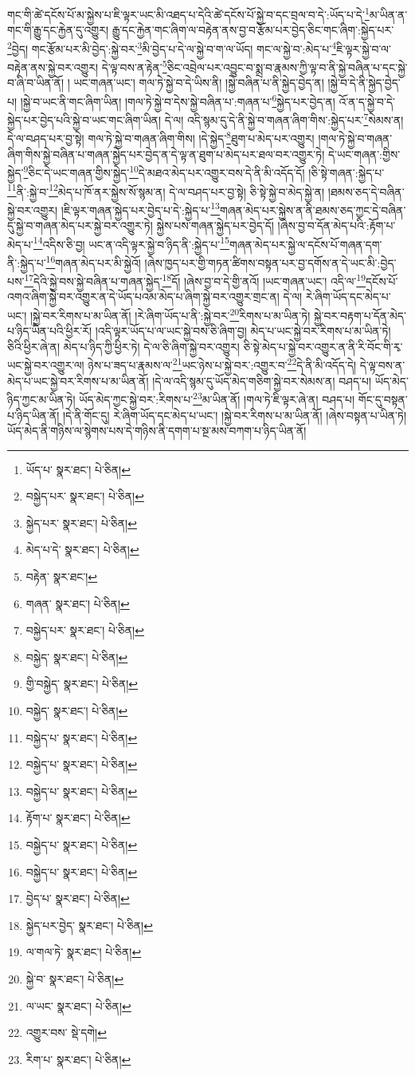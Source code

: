 གང་གི་ཚེ་དངོས་པོ་མ་སྐྱེས་པ་ཇི་ལྟར་ཡང་མི་འཐད་པ་དེའི་ཚེ་དངོས་པོ་སྐྱེ་བ་དང་བྲལ་བ་དེ་:ཡོད་པ་དེ་\footnote{ཡོད་པ་  སྣར་ཐང་།  པེ་ཅིན། }མ་ཡིན་ན་གང་གི་རྒྱུ་དང་རྐྱེན་དུ་འགྱུར། རྒྱུ་དང་རྐྱེན་གང་ཞིག་ལ་བརྟེན་ནས་བྱ་བ་རྩོམ་པར་བྱེད་ཅིང་གང་ཞིག་:སྐྱེད་པར་\footnote{བསྐྱེད་པར་  སྣར་ཐང་།  པེ་ཅིན། }བྱེད། གང་རྩོམ་པར་མི་བྱེད་:སྐྱེ་བར་\footnote{སྐྱེད་པར་  སྣར་ཐང་།  པེ་ཅིན། }མི་བྱེད་པ་དེ་ལ་སྐྱེ་བ་ག་ལ་ཡོད། གང་ལ་སྐྱེ་བ་:མེད་པ་\footnote{མེད་པ་དེ་  སྣར་ཐང་།  པེ་ཅིན། }ཇི་ལྟར་སྐྱེ་བ་ལ་བརྟེན་ནས་སྐྱེ་བར་འགྱུར། དེ་ལྟ་བས་ན་རྟེན་\footnote{བརྟེན་  སྣར་ཐང་། }ཅིང་འབྲེལ་པར་འབྱུང་བ་སྨྲ་བ་རྣམས་ཀྱི་ལྟ་བ་ནི་སྐྱེ་བཞིན་པ་དང་སྐྱེ་བ་ཞི་བ་ཡིན་ནོ། །
ཡང་གཞན་ཡང་། གལ་ཏེ་སྐྱེ་བ་དེ་ཡིས་ནི། །སྐྱེ་བཞིན་པ་ནི་སྐྱེད་བྱེད་ན། །སྐྱེ་བ་དེ་ནི་སྐྱེད་བྱེད་པ། །སྐྱེ་བ་ཡང་ནི་གང་ཞིག་ཡིན། །གལ་ཏེ་སྐྱེ་བ་དེས་སྐྱེ་བཞིན་པ་:གཞན་པ་\footnote{གཞན་  སྣར་ཐང་།  པེ་ཅིན། }སྐྱེད་པར་བྱེད་ན། འོ་ན་ད་སྐྱེ་བ་དེ་སྐྱེད་པར་བྱེད་པའི་སྐྱེ་བ་ཡང་གང་ཞིག་ཡིན། དེ་ལ། འདི་སྙམ་དུ་དེ་ནི་སྐྱེ་བ་གཞན་ཞིག་གིས་:སྐྱེད་པར་\footnote{བསྐྱེད་པར་  སྣར་ཐང་།  པེ་ཅིན། }སེམས་ན། དེ་ལ་བཤད་པར་བྱ་སྟེ། གལ་ཏེ་སྐྱེ་བ་གཞན་ཞིག་གིས། །དེ་སྐྱེད་\footnote{བསྐྱེད་  སྣར་ཐང་།  པེ་ཅིན། }ཐུག་པ་མེད་པར་འགྱུར། །གལ་ཏེ་སྐྱེ་བ་གཞན་ཞིག་གིས་སྐྱེ་བཞིན་པ་གཞན་སྐྱེད་པར་བྱེད་ན་དེ་ལྟ་ན་ཐུག་པ་མེད་པར་ཐལ་བར་འགྱུར་ཏེ། དེ་ཡང་གཞན་:གྱིས་སྐྱེད་\footnote{གྱི་བསྐྱེད་  སྣར་ཐང་།  པེ་ཅིན། }ཅིང་དེ་ཡང་གཞན་གྱིས་སྐྱེད་\footnote{བསྐྱེད་  སྣར་ཐང་།  པེ་ཅིན། }དེ་མཐའ་མེད་པར་འགྱུར་བས་དེ་ནི་མི་འདོད་དོ། །ཅི་སྟེ་གཞན་:སྐྱེད་པ་\footnote{བསྐྱེད་པ་  སྣར་ཐང་།  པེ་ཅིན། }ནི་:སྐྱེ་བ་\footnote{བསྐྱེད་པ་  སྣར་ཐང་།  པེ་ཅིན། }མེད་པ་ཁོ་ནར་སྐྱེས་སོ་སྙམ་ན། དེ་ལ་བཤད་པར་བྱ་སྟེ། ཅི་སྟེ་སྐྱེ་བ་མེད་སྐྱེ་ན། །ཐམས་ཅད་དེ་བཞིན་སྐྱེ་བར་འགྱུར། །ཇི་ལྟར་གཞན་སྐྱེད་པར་བྱེད་པ་དེ་:སྐྱེད་པ་\footnote{བསྐྱེད་པ་  སྣར་ཐང་།  པེ་ཅིན། }གཞན་མེད་པར་སྐྱེས་ན་ནི་ཐམས་ཅད་ཀྱང་དེ་བཞིན་དུ་སྐྱེ་བ་གཞན་མེད་པར་སྐྱེ་བར་འགྱུར་ཏེ། སྐྱེས་པས་གཞན་སྐྱེད་པར་བྱེད་དོ། །ཞེས་བྱ་བ་དོན་མེད་པའི་:རྟོག་པ་མེད་པ་\footnote{རྟོག་པ་  སྣར་ཐང་།  པེ་ཅིན། }འདིས་ཅི་བྱ། ཡང་ན་འདི་ལྟར་སྐྱེ་བ་ཉིད་ནི་:སྐྱེད་པ་\footnote{བསྐྱེད་པ་  སྣར་ཐང་།  པེ་ཅིན། }གཞན་མེད་པར་སྐྱེ་ལ་དངོས་པོ་གཞན་དག་ནི་:སྐྱེད་པ་\footnote{བསྐྱེད་པ་  སྣར་ཐང་།  པེ་ཅིན། }གཞན་མེད་པར་མི་སྐྱེའོ། །ཞེས་ཁྱད་པར་གྱི་གཏན་ཚིགས་བསྟན་པར་བྱ་དགོས་ན་དེ་ཡང་མི་:བྱེད་པས་\footnote{བྱེད་པ་  སྣར་ཐང་།  པེ་ཅིན། }དེའི་སྐྱེ་བས་སྐྱེ་བཞིན་པ་གཞན་སྐྱེད་\footnote{སྐྱེད་པར་བྱེད་  སྣར་ཐང་།  པེ་ཅིན། }དོ། །ཞེས་བྱ་བ་དེ་གྱི་ནའོ། །ཡང་གཞན་ཡང་། འདི་ལ་\footnote{ལ་གལ་ཏེ་  སྣར་ཐང་།  པེ་ཅིན། }དངོས་པོ་འགའ་ཞིག་སྐྱེ་བར་འགྱུར་ན་དེ་ཡོད་པའམ་མེད་པ་ཞིག་སྐྱེ་བར་འགྱུར་གྲང་ན། དེ་ལ། རེ་ཞིག་ཡོད་དང་མེད་པ་ཡང་། །སྐྱེ་བར་རིགས་པ་མ་ཡིན་ནོ། །རེ་ཞིག་ཡོད་པ་ནི་:སྐྱེ་བར་\footnote{སྐྱེ་བ་  སྣར་ཐང་།  པེ་ཅིན། }རིགས་པ་མ་ཡིན་ཏེ། སྐྱེ་བར་བརྟག་པ་དོན་མེད་པ་ཉིད་ཡིན་པའི་ཕྱིར་རོ། །འདི་ལྟར་ཡོད་པ་ལ་ཡང་སྐྱེ་བས་ཅི་ཞིག་བྱ། མེད་པ་ཡང་སྐྱེ་བར་རིགས་པ་མ་ཡིན་ཏེ། ཅིའི་ཕྱིར་ཞེ་ན། མེད་པ་ཉིད་ཀྱི་ཕྱིར་ཏེ། དེ་ལ་ཅི་ཞིག་སྐྱེ་བར་འགྱུར། ཅི་སྟེ་མེད་པ་སྐྱེ་བར་འགྱུར་ན་ནི་རི་བོང་གི་རྭ་ཡང་སྐྱེ་བར་འགྱུར་ལ། ཉེས་པ་ཟད་པ་རྣམས་ལ་\footnote{ལ་ཡང་  སྣར་ཐང་།  པེ་ཅིན། }ཡང་ཉེས་པ་སྐྱེ་བར་:འགྱུར་བ་\footnote{འགྱུར་བས་  སྡེ་དགེ། }དེ་ནི་མི་འདོད་དེ། དེ་ལྟ་བས་ན་མེད་པ་ཡང་སྐྱེ་བར་རིགས་པ་མ་ཡིན་ནོ། །དེ་ལ་འདི་སྙམ་དུ་ཡོད་མེད་གཅིག་སྐྱེ་བར་སེམས་ན། བཤད་པ། ཡོད་མེད་ཉིད་ཀྱང་མ་ཡིན་ཏེ། ཡོད་མེད་ཀྱང་སྐྱེ་བར་:རིགས་པ་\footnote{རིག་པ་  སྣར་ཐང་།  པེ་ཅིན། }མ་ཡིན་ནོ། །གལ་ཏེ་ཇི་ལྟར་ཞེ་ན། བཤད་པ། གོང་དུ་བསྟན་པ་ཉིད་ཡིན་ནོ། །དེ་ནི་གོང་དུ། རེ་ཞིག་ཡོད་དང་མེད་པ་ཡང་། །སྐྱེ་བར་རིགས་པ་མ་ཡིན་ནོ། །ཞེས་བསྟན་པ་ཡིན་ཏེ། ཡོད་མེད་ནི་གཉིས་ལ་སྙེགས་པས་དེ་གཉིས་ནི་དགག་པ་སྔ་མས་བཀག་པ་ཉིད་ཡིན་ནོ། 